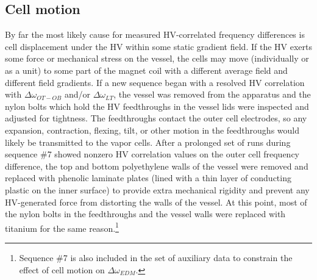 \documentclass [10pt, twoside] {uwthesis}[2012/04/02]
\begin{document}
\subsection{Cell motion}
By far the most likely cause for measured HV-correlated frequency differences is cell displacement under the HV within some static gradient field. If the HV exerts some force or mechanical stress on the vessel, the cells may move (individually or as a unit) to some part of the magnet coil with a different average field and different field gradients. If a new sequence began with a resolved HV correlation with $\Delta\omega_{OT-OB}$ and/or $\Delta\omega_{LT}$, the vessel was removed from the apparatus and the nylon bolts which hold the HV feedthroughs in the vessel lids were inspected and adjusted for tightness. The feedthroughs contact the outer cell electrodes, so any expansion, contraction, flexing, tilt, or other motion in the feedthroughs would likely be transmitted to the vapor cells. After a prolonged set of runs during sequence \#7 showed nonzero HV correlation values on the outer cell frequency difference, the top and bottom polyethylene walls of the vessel were removed and replaced with phenolic laminate plates (lined with a thin layer of conducting plastic on the inner surface) to provide extra mechanical rigidity and prevent any HV-generated force from distorting the walls of the vessel. At this point, most of the nylon bolts in the feedthroughs and the vessel walls were replaced with titanium for the same reason.\footnote{Sequence \#7 is also included in the set of auxiliary data to constrain the effect of cell motion on $\Delta\omega_{EDM}.$}
\end{document}
